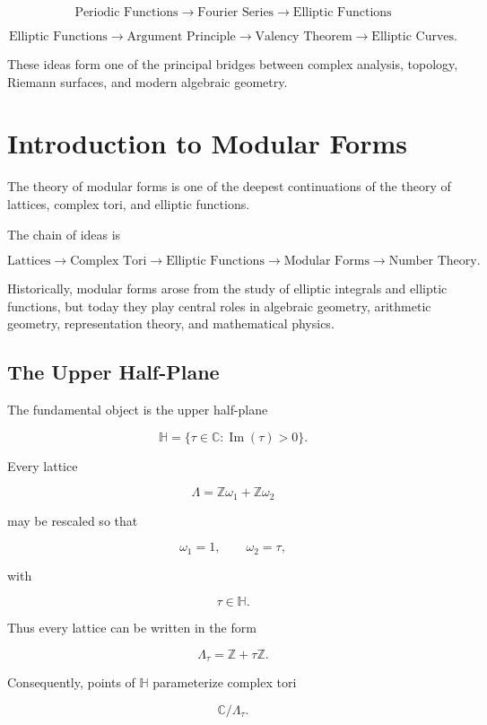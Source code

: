 \documentclass[12pt,a4paper]{article}
\theoremstyle{notespace}
\begin{document}
\[
\text{Periodic Functions}
\longrightarrow
\text{Fourier Series}
\longrightarrow
\text{Elliptic Functions}
\]

\[
\text{Elliptic Functions}
\longrightarrow
\text{Argument Principle}
\longrightarrow
\text{Valency Theorem}
\longrightarrow
\text{Elliptic Curves}.
\]

These ideas form one of the principal bridges between complex analysis, topology, Riemann surfaces, and modern algebraic geometry.	

\section{Introduction to Modular Forms}

The theory of modular forms is one of the deepest continuations of the theory of lattices, complex tori, and elliptic functions.

The chain of ideas is

\[
\text{Lattices}
\longrightarrow
\text{Complex Tori}
\longrightarrow
\text{Elliptic Functions}
\longrightarrow
\text{Modular Forms}
\longrightarrow
\text{Number Theory}.
\]

Historically, modular forms arose from the study of elliptic integrals and elliptic functions, but today they play central roles in algebraic geometry, arithmetic geometry, representation theory, and mathematical physics.

\subsection{The Upper Half-Plane}

The fundamental object is the upper half-plane

\[
\mathbb H
=
\{\tau\in\mathbb C:\operatorname{Im}(\tau)>0\}.
\]

Every lattice

\[
\Lambda
=
\mathbb Z\omega_1+\mathbb Z\omega_2
\]

may be rescaled so that

\[
\omega_1=1,
\qquad
\omega_2=\tau,
\]

with

\[
\tau\in\mathbb H.
\]

Thus every lattice can be written in the form

\[
\Lambda_\tau
=
\mathbb Z+\tau\mathbb Z.
\]

Consequently, points of \(\mathbb H\) parameterize complex tori

\[
\mathbb C/\Lambda_\tau.
\]
\end{document}

